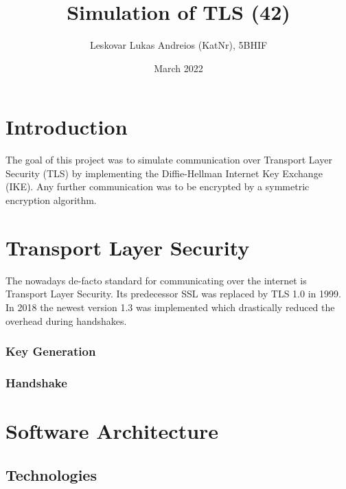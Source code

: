 \documentclass[12pt, letterpaper]{article}
\title{Simulation of TLS (42)}
\author{Leskovar Lukas Andreios (KatNr), 5BHIF}
\date{March 2022}
\begin{document}
\begin{titlepage}
\maketitle
\end{titlepage}

\tableofcontents
\newpage

\section{Introduction}
The goal of this project was to simulate communication over Transport Layer Security (TLS) by implementing the Diffie-Hellman Internet Key Exchange (IKE). Any further communication was to be encrypted by a symmetric encryption algorithm.

\section{Transport Layer Security}
The nowadays de-facto standard for communicating over the internet is Transport Layer Security. Its predecessor SSL was replaced by TLS 1.0 in 1999. In 2018 the newest version 1.3 was implemented which drastically reduced the overhead during handshakes.

\subsubsection{Key Generation}


\subsubsection{Handshake}


\section{Software Architecture}

\subsection{Technologies}
\end{document}
